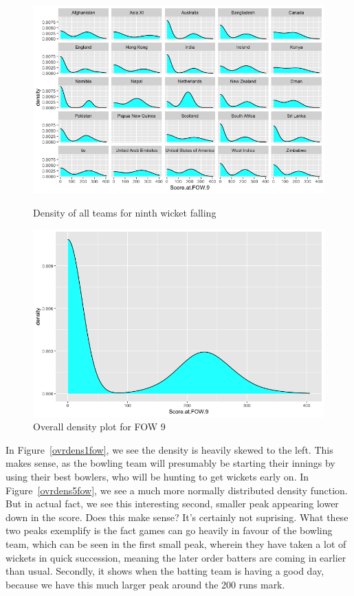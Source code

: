 \begin{figure}
    \centering
    \begin{minipage}{0.4\textwidth}
        \centering
        \includegraphics[scale=0.3]{figures/fow9density.png}
        \caption{Density of all teams for ninth wicket falling}
        \label{alldens9fow}
    \end{minipage}
    \begin{minipage}{0.4\textwidth}
        \centering
        \includegraphics[scale=0.3]{figures/fow9densfull.png}
        \caption{Overall density plot for FOW 9}
        \label{ovrdens9fow}
    \end{minipage}
\end{figure}

In Figure~\ref{ovrdens1fow}, we see the density is heavily skewed to the left. This makes sense, as the bowling team will presumably be starting 
their innings by using their best bowlers, who will be hunting to get wickets early on. In Figure~\ref{ovrdens5fow}, we see a much more normally distributed
density function. But in actual fact, we see this interesting second, smaller peak appearing lower down in the score. Does this make sense? It's certainly 
not suprising. What these two peaks exemplify is the fact games can go heavily in favour of the bowling team, which can be seen in the first small peak,
wherein they have taken a lot of wickets in quick succession, meaning the later order batters are coming in earlier than usual. Secondly, it shows when the 
batting team is having a good day, because we have this much larger peak around the 200 runs mark.\\

